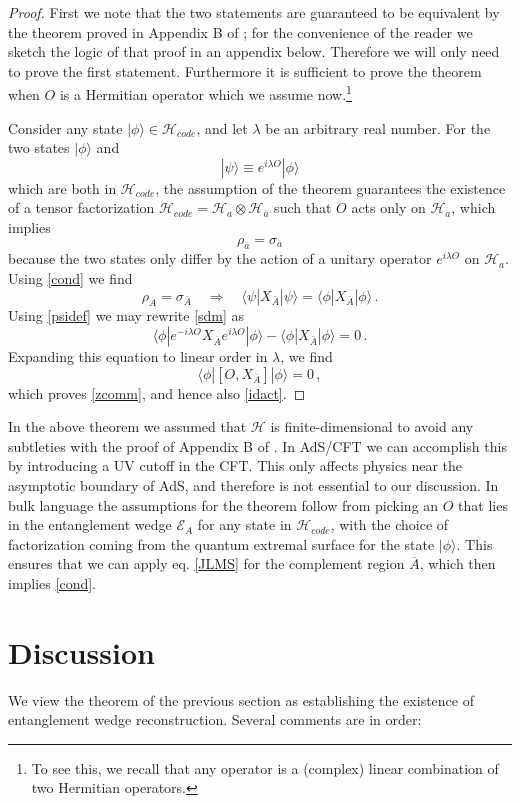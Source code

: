 \documentclass[aps,nofootinbib,longbibliography,superscriptaddress,12pt]{revtex4-1}
\newcommand{\be}{\begin{equation}}
\newcommand{\ee}{\end{equation}}
\newcommand{\ran}{\rangle}
\newcommand{\EA}{\mathcal{E}_A}
\newcommand{\Ab}{\overline{A}}
\newcommand{\ab}{\overline{a}}
\newcommand{\Hc}{\mathcal{H}_{code}}
\newcommand{\Ha}{\mathcal{H}_a}
\newcommand{\Hab}{\mathcal{H}_{\overline{a}}}
\newcommand{\mH}{\mathcal{H}}
\def\l{\lambda}
\def\p{\phi}
\def\r{\rho}
\def\s{\sigma}
\def\y{\psi}
\def\la{\label}
\def\er{\eqref}
\def\eq{\equiv}
\def\qu{\quad}
\def\<{\langle}
\def\>{\rangle}
\begin{document}
\begin{proof}
First we note that the two statements are guaranteed to be equivalent by the theorem proved in Appendix B of \cite{Almheiri:2014lwa}; for the convenience of the reader we sketch the logic of that proof in an appendix below.  Therefore we will only need to prove the first statement.  Furthermore it is sufficient to prove the theorem when $O$ is a Hermitian operator which we assume now.\footnote{To see this, we recall that any operator is a (complex) linear combination of two Hermitian operators.}

Consider any state $|\p\> \in \Hc$, and let $\l$ be an arbitrary real number.  For the two states $|\p\> $ and
\be\la{psidef}
|\y\> \eq e^{i\l O} |\p\>
\ee
which are both in $\Hc$, the assumption of the theorem guarantees the existence of a tensor factorization $\Hc = \Ha \otimes \Hab$ such that $O$ acts only on $\Ha$, which implies
\be
\r_{\ab} = \s_{\ab}
\ee
because the two states only differ by the action of a unitary operator $e^{i\l O}$ on $\Ha$.  Using \er{cond} we find
\be\la{sdm}
\r_{\Ab} = \s_{\Ab} \qu\Rightarrow\qu \<\y |X_{\Ab}| \y\> = \<\p |X_{\Ab}| \p\> \,.
\ee
Using \er{psidef} we may rewrite \er{sdm} as
\be
\<\p | e^{-i\l O} X_{\Ab} e^{i\l O} | \p\> - \<\p |X_{\Ab}| \p\> =0 \,.
\ee
Expanding this equation to linear order in $\l$, we find
\be
\<\p | [O, X_{\Ab}] | \p\> =0 \,,
\ee
which proves \er{zcomm}, and hence also \er{idact}.
\end{proof}

In the above theorem we assumed that $\mH$ is finite-dimensional to avoid any subtleties with the proof of Appendix B of \cite{Almheiri:2014lwa}.  In AdS/CFT we can accomplish this by introducing a UV cutoff in the CFT. This only affects physics near the asymptotic boundary of AdS, and therefore is not essential to our discussion.  In bulk language the assumptions for the theorem follow from picking an $O$ that lies in the entanglement wedge $\EA$ for any state in $\Hc$, with the choice of factorization coming from the quantum extremal surface for the state $|\phi\ran$.  This ensures that we can apply eq. \eqref{JLMS} for the complement region $\Ab$, which then implies \eqref{cond}.


\section{Discussion}
We view the theorem of the previous section as establishing the existence of entanglement wedge reconstruction.  Several comments are in order:
\end{document}

